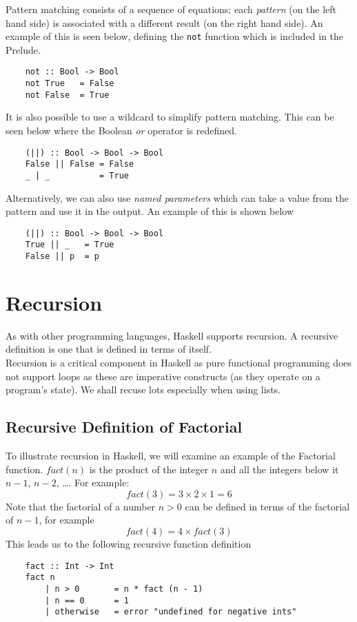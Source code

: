 Pattern matching consists of a sequence of equations; each \textit{pattern} (on the left hand side) is associated with a different result (on the right hand side). An example of this is seen below, defining the \verb|not| function which is included in the Prelude.
\begin{verbatim}
    not :: Bool -> Bool
    not True   = False
    not False  = True
\end{verbatim}

It is also possible to use a wildcard to simplify pattern matching. This can be seen below where the Boolean \textit{or} operator is redefined.
\begin{verbatim}
    (||) :: Bool -> Bool -> Bool
    False || False = False
    _ | _          = True
\end{verbatim}
Alternatively, we can also use \textit{named parameters} which can take a value from the pattern and use it in the output. An example of this is shown below
\begin{verbatim}
    (||) :: Bool -> Bool -> Bool
    True || _   = True
    False || p  = p
\end{verbatim}


\section{Recursion}
As with other programming languages, Haskell supports recursion. A recursive definition is one that is defined in terms of itself.\\

Recursion is a critical component in Haskell as pure functional programming does not support loops as these are imperative constructs (as they operate on a program's state). We shall recuse lots especially when using lists.

\subsection{Recursive Definition of Factorial}
To illustrate recursion in Haskell, we will examine an example of the Factorial function. $fact(n)$ is the product of the integer $n$ and all the integers below it $n-1$, $n-2$, \ldots. For example:
\[ fact(3) = 3 \times 2 \times 1 = 6 \]
Note that the factorial of a number $n > 0$ can be defined in terms of the factorial of $n-1$, for example
\[ fact(4) = 4 \times fact(3) \]
This leads us to the following recursive function definition
\begin{verbatim}
    fact :: Int -> Int
    fact n
        | n > 0       = n * fact (n - 1)
        | n == 0      = 1
        | otherwise   = error "undefined for negative ints"
\end{verbatim}

